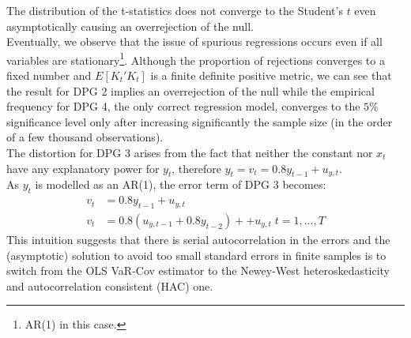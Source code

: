 \documentclass[]{article}
\begin{document}
The distribution of the t-statistics does not converge to the Student's $t$ even asymptotically causing an overrejection of the null.\\
Eventually, we observe that the issue of spurious regressions occurs even if all variables are stationary\footnote{AR(1) in this case.}.
Although the proportion of rejections converges to a fixed number and $E[K_{t}'K_{t}]$ is a finite definite positive metric, we can see that the result for DPG 2 implies an overrejection of the null while the empirical frequency for DPG 4, the only correct regression model, converges to the $5\%$ significance level only after increasing significantly the sample size (in the order of a few thousand observations). \\  
The distortion for DPG 3 arises from the fact that neither the constant nor $x_t$ have any explanatory power for $y_t$, therefore $y_t = v_t = 0.8y_{t-1}+u_{y,t}$.\\ As $y_t$ is modelled as an AR(1), the error term of DPG 3 becomes:
\begin{align*}
	v_t &= 0.8y_{t-1}+u_{y,t} \\
	v_t &= 0.8(u_{y,t-1} + 0.8y_{t-2}) + +u_{y,t} \; t=1,...,T
\end{align*}
This intuition suggests that there is serial autocorrelation in the errors and the (asymptotic) solution to avoid too small standard errors in finite samples is to switch from the OLS VaR-Cov estimator to the Newey-West heteroskedasticity and autocorrelation consistent (HAC) one.
\end{document}
